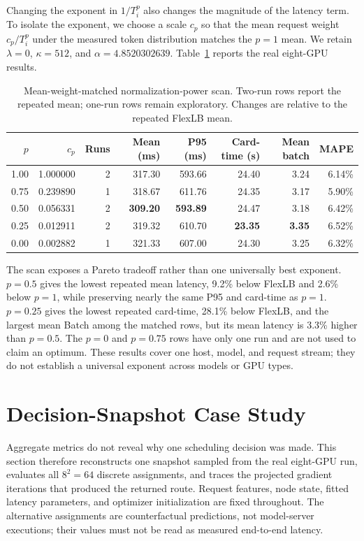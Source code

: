 \documentclass[10pt]{article}
\begin{document}
Changing the exponent in $1/T_i^p$ also changes the magnitude of the latency
term. To isolate the exponent, we choose a scale $c_p$ so that the mean
request weight $c_p/T_i^p$ under the measured token distribution matches the
$p=1$ mean. We retain $\lambda=0$, $\kappa=512$, and
$\alpha=4.8520302639$. Table~\ref{tab:normalization-power} reports the real
eight-GPU results.

\begin{table}[t]
\centering
\small
\caption{Mean-weight-matched normalization-power scan. Two-run rows report
the repeated mean; one-run rows remain exploratory. Changes are relative to
the repeated FlexLB mean.}
\label{tab:normalization-power}
\begin{tabular}{rrrrrrrr}
\toprule
$p$ & $c_p$ & Runs & Mean (ms) & P95 (ms) & Card-time (s) & Mean batch & MAPE \\
\midrule
1.00 & 1.000000 & 2 & 317.30 & 593.66 & 24.40 & 3.24 & 6.14\% \\
0.75 & 0.239890 & 1 & 318.67 & 611.76 & 24.35 & 3.17 & 5.90\% \\
0.50 & 0.056331 & 2 & \textbf{309.20} & \textbf{593.89} & 24.47 & 3.18 & 6.42\% \\
0.25 & 0.012911 & 2 & 319.32 & 610.70 & \textbf{23.35} & \textbf{3.35} & 6.52\% \\
0.00 & 0.002882 & 1 & 321.33 & 607.00 & 24.30 & 3.25 & 6.32\% \\
\bottomrule
\end{tabular}
\end{table}

The scan exposes a Pareto tradeoff rather than one universally best exponent.
$p=0.5$ gives the lowest repeated mean latency, 9.2\% below FlexLB and 2.6\%
below $p=1$, while preserving nearly the same P95 and card-time as $p=1$.
$p=0.25$ gives the lowest repeated card-time, 28.1\% below FlexLB, and the
largest mean Batch among the matched rows, but its mean latency is 3.3\%
higher than $p=0.5$. The $p=0$ and $p=0.75$ rows have only one run and are not
used to claim an optimum. These results cover one host, model, and request
stream; they do not establish a universal exponent across models or GPU types.

\FloatBarrier
\clearpage
\section{Decision-Snapshot Case Study}
\label{sec:decision-snapshot-case-study}

Aggregate metrics do not reveal why one scheduling decision was made. This
section therefore reconstructs one snapshot sampled from the real eight-GPU
run, evaluates all $8^2=64$ discrete assignments, and traces the projected
gradient iterations that produced the returned route. Request features, node
state, fitted latency parameters, and optimizer initialization are fixed
throughout. The alternative assignments are counterfactual predictions, not
model-server executions; their values must not be read as measured
end-to-end latency.
\end{document}
